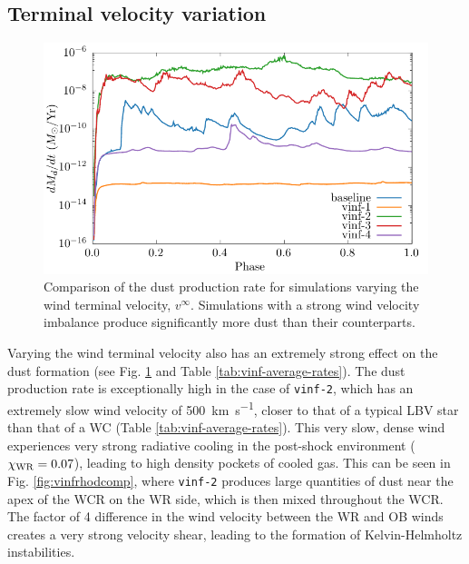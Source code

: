 \subsection{Terminal velocity variation}
\label{sec:paper1vinfresults}

\begin{figure}
  \centering
  \includegraphics{assets/vinf-phase-dust_rate.pdf}
  \caption[Comparison of the dust production rate for simulations varying the wind terminal velocity]{Comparison of the dust production rate for simulations varying the wind terminal velocity, $v^\infty$. Simulations with a strong wind velocity imbalance produce significantly more dust than their counterparts.}
  \label{fig:vinfdustproduction}
\end{figure}

Varying the wind terminal velocity also has an extremely strong effect on the dust formation (see Fig. \ref{fig:vinfdustproduction} and Table \ref{tab:vinf-average-rates}).
The dust production rate is exceptionally high in the case of \texttt{vinf-2}, which has an extremely slow wind velocity of \SI{500}{\kilo\metre\per\second}, closer to that of a typical LBV star than that of a WC (Table \ref{tab:vinf-average-rates}).
This very slow, dense wind experiences very strong radiative cooling in the post-shock environment ($\chi_{\text{WR}} = 0.07$), leading to high density pockets of cooled gas.
This can be seen in Fig. \ref{fig:vinfrhodcomp}, where \texttt{vinf-2} produces large quantities of dust near the apex of the WCR on the WR side, which is then mixed throughout the WCR.
The factor of 4 difference in the wind velocity between the WR and OB winds creates a very strong velocity shear, leading to the formation of Kelvin-Helmholtz instabilities.


